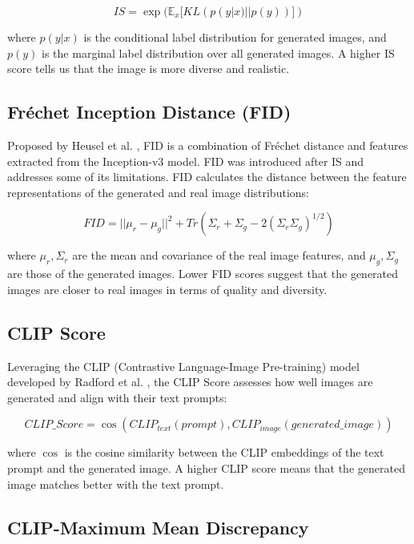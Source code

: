 \documentclass{article}
\begin{document}
\begin{equation}
    IS = \exp(\mathbb{E}_x[KL(p(y|x) || p(y))])
\end{equation}

where $p(y|x)$ is the conditional label distribution for generated images, and $p(y)$ is the marginal label distribution over all generated images.
A higher IS score tells us that the image is more diverse and realistic.


\subsection{Fréchet Inception Distance (FID)}

Proposed by Heusel et al. \cite{heusel2017gans}, FID is a combination of Fréchet distance and features extracted from the 
Inception-v3 model. FID was introduced after IS and addresses some of its limitations.
FID calculates the distance between the feature representations of the generated and real image distributions:

\begin{equation}
    FID = ||\mu_r - \mu_g||^2 + Tr(\Sigma_r + \Sigma_g - 2(\Sigma_r \Sigma_g)^{1/2})
\end{equation}

where $\mu_r, \Sigma_r$ are the mean and covariance of the real image features, and $\mu_g, \Sigma_g$ are those of the generated images.
 Lower FID scores suggest that the generated images are closer to real images in terms of quality and diversity.

\subsection{CLIP Score}

Leveraging the CLIP (Contrastive Language-Image Pre-training) model developed by Radford et al. \cite{radford2021learning}, 
the CLIP Score assesses how well images are generated and align with their text prompts:

\begin{equation}
    CLIP\_Score = \cos(CLIP_{text}(prompt), CLIP_{image}(generated\_image))
\end{equation}

where $\cos$ is the cosine similarity between the CLIP embeddings of the text prompt and the generated image.
A higher CLIP score means that the generated image matches better with the text prompt.

\subsection{CLIP-Maximum Mean Discrepancy}
\end{document}
